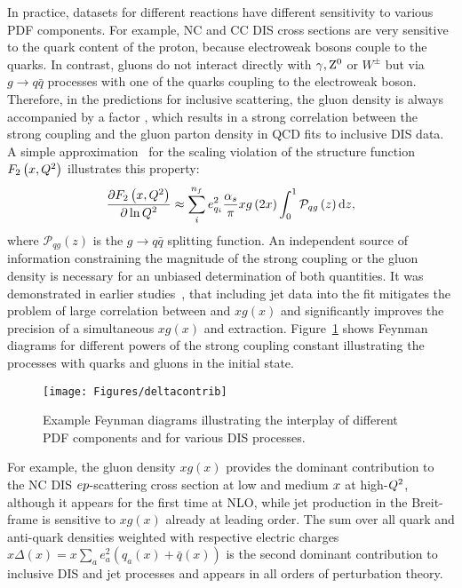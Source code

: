 In practice, datasets for different reactions have different sensitivity to various PDF components. For example, NC and CC DIS cross sections are very sensitive to the quark content of the proton, because electroweak bosons couple to the quarks. In contrast, gluons do not interact directly with $\gamma,\mbox{$\rm{Z}^0$}$ or $W^{\pm}$ but via $g\rightarrow q\bar q$ processes with one of the quarks coupling to the electroweak boson. Therefore, in the predictions for inclusive \ep scattering, the gluon density is always accompanied by a factor \as, which results in a strong correlation between the strong coupling and the gluon parton density in QCD fits to inclusive DIS data. A simple approximation~\cite{Prytz:1993vr} for the scaling violation of the structure function $F_2\left(x,\mbox{${Q^2}$} \right)$ illustrates this property:
\begin{equation}
 \frac{\partial F_2\left(x,\mbox{${Q^2}$} \right)}{\partial \ln \mbox{${Q^2}$}} \approx \sum_i^{n_f}e_{q_i}^2 \frac{\mbox{$\alpha_{s}$}}{\pi} xg\left(2x\right) \int_0^1 \mathcal{P}_{qg}\left(z\right)\mathrm{d}z, 
\end{equation}
where $\mathcal{P}_{qg}\left(z\right)$ is the $g\rightarrow q\bar q$ splitting function. An independent source of information constraining the magnitude of the strong coupling or the gluon density is necessary for an unbiased determination of both quantities. It was demonstrated in earlier studies~\cite{Chekanov:2005nn,H1prelim-11-143,ZEUS-prel-11-010}, that including jet data into the fit mitigates the problem of large correlation between \as and $xg\left(x\right)$ and significantly improves the precision of a simultaneous $xg\left(x\right)$ and \as extraction. Figure~\ref{fig:pdfcontributions} shows Feynman diagrams for different powers of the strong coupling constant illustrating the processes with quarks and gluons in the initial state.
\begin{figure}[htp]
 \centering
 \begin{center}
 \texttt{[image: Figures/deltacontrib]}
\end{center}
 \caption{Example Feynman diagrams illustrating the interplay of different PDF components and \as for various DIS processes.}
 \label{fig:pdfcontributions}
\end{figure}
For example, the gluon density $xg\left(x\right)$ provides the dominant contribution to the NC DIS $\mbox{$e p$}$-scattering cross section at low and medium $\mbox{${x}$}$ at high-$\mbox{${Q^2}$}$, although it appears for the first time at NLO, while jet production in the Breit-frame is sensitive to $xg\left(x\right)$ already at leading order. The sum over all quark and anti-quark densities weighted with respective electric charges $x\Delta\left(x\right)=x\sum_{a}{e_a^2\left(q_a\left(x\right)+\bar{q}\left(x\right)\right)}$ is the second dominant contribution to inclusive DIS and jet processes and appears in all orders of perturbation theory.
